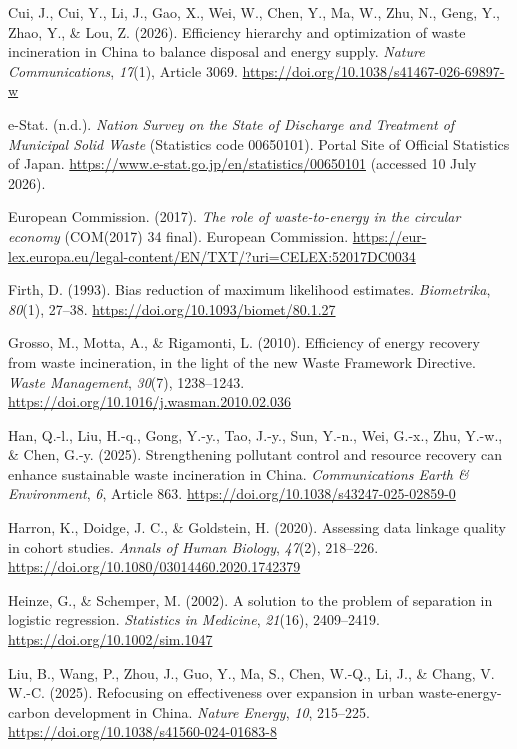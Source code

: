 \documentclass[11pt,letterpaper]{article}
\begin{document}
Cui, J., Cui, Y., Li, J., Gao, X., Wei, W., Chen, Y., Ma, W., Zhu, N., Geng,
Y., Zhao, Y., \& Lou, Z. (2026). Efficiency hierarchy and optimization of
waste incineration in China to balance disposal and energy supply.
\textit{Nature Communications}, \textit{17}(1), Article 3069.
\url{https://doi.org/10.1038/s41467-026-69897-w}

e-Stat. (n.d.). \textit{Nation Survey on the State of Discharge and Treatment
of Municipal Solid Waste} (Statistics code 00650101). Portal Site of Official
Statistics of Japan. \url{https://www.e-stat.go.jp/en/statistics/00650101}
(accessed 10 July 2026).

European Commission. (2017). \textit{The role of waste-to-energy in the
circular economy} (COM(2017) 34 final). European Commission.
\url{https://eur-lex.europa.eu/legal-content/EN/TXT/?uri=CELEX:52017DC0034}

Firth, D. (1993). Bias reduction of maximum likelihood estimates.
\textit{Biometrika}, \textit{80}(1), 27--38.
\url{https://doi.org/10.1093/biomet/80.1.27}

Grosso, M., Motta, A., \& Rigamonti, L. (2010). Efficiency of energy recovery
from waste incineration, in the light of the new Waste Framework Directive.
\textit{Waste Management}, \textit{30}(7), 1238--1243.
\url{https://doi.org/10.1016/j.wasman.2010.02.036}

Han, Q.-l., Liu, H.-q., Gong, Y.-y., Tao, J.-y., Sun, Y.-n., Wei, G.-x., Zhu,
Y.-w., \& Chen, G.-y. (2025). Strengthening pollutant control and resource
recovery can enhance sustainable waste incineration in China.
\textit{Communications Earth \& Environment}, \textit{6}, Article 863.
\url{https://doi.org/10.1038/s43247-025-02859-0}

Harron, K., Doidge, J. C., \& Goldstein, H. (2020). Assessing data linkage
quality in cohort studies. \textit{Annals of Human Biology}, \textit{47}(2),
218--226. \url{https://doi.org/10.1080/03014460.2020.1742379}

Heinze, G., \& Schemper, M. (2002). A solution to the problem of separation in
logistic regression. \textit{Statistics in Medicine}, \textit{21}(16),
2409--2419. \url{https://doi.org/10.1002/sim.1047}

Liu, B., Wang, P., Zhou, J., Guo, Y., Ma, S., Chen, W.-Q., Li, J., \& Chang,
V. W.-C. (2025). Refocusing on effectiveness over expansion in urban
waste-energy-carbon development in China. \textit{Nature Energy}, \textit{10},
215--225. \url{https://doi.org/10.1038/s41560-024-01683-8}
\end{document}
